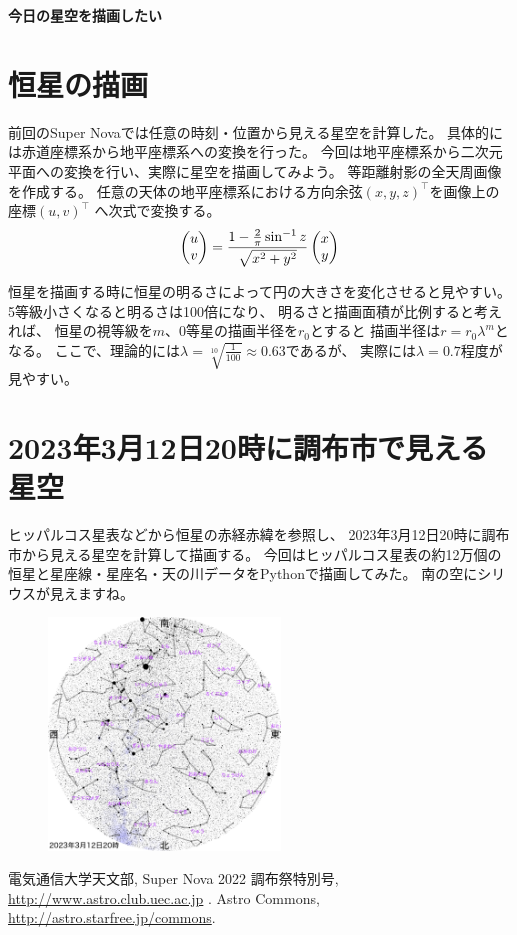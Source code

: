 \documentclass[
  paper=a4 , %
  book , %
  openany, %
  fontsize=10pt , %
  jafontsize=10pt, %
  gutter=25.6mm, %
  head_space=20mm, %
  foot_space=20mm, %
  line_length=165mm, %
  jlreq_warnings , %
]{jsarticle}
\def\mylove{\K=0 \loop\ifnum\K<100                                                  
女の子が好きだった...。\advance\K by1\repeat}
\begin{document}
\centerline{\Large{\bf 今日の星空を描画したい}}
\vspace{-3mm}
\section*{恒星の描画}
\vspace{-2mm}
前回のSuper Nova\cite{a}では任意の時刻・位置から見える星空を計算した。
具体的には赤道座標系から地平座標系への変換を行った。
今回は地平座標系から二次元平面への変換を行い、実際に星空を描画してみよう。
等距離射影の全天周画像を作成する。
任意の天体の地平座標系における方向余弦$(x,y,z)^\top$を画像上の座標$(u,v)^\top$
へ次式で変換する。
\vspace{-3mm}
\begin{align}
  \begin{pmatrix}
      u \\ v \\
  \end{pmatrix}
  =
  \frac{1-\frac{2}{\pi} \sin^{-1}{z}}{\sqrt{x^2 + y^2}}
  \begin{pmatrix}
    x \\ y \\
  \end{pmatrix}
  \notag
\end{align}

恒星を描画する時に恒星の明るさによって円の大きさを変化させると見やすい。
5等級小さくなると明るさは100倍になり、
明るさと描画面積が比例すると考えれば、
恒星の視等級を$m$、0等星の描画半径を$r_0$とすると
描画半径は$r = r_0 \lambda^m$となる。
ここで、理論的には$\lambda = \sqrt[10]{\frac{1}{100}} \approx 0.63$であるが、
実際には$\lambda = 0.7$程度が見やすい。

\vspace{-3mm}
\section*{2023年3月12日20時に調布市で見える星空}
\vspace{-2mm}
ヒッパルコス星表などから恒星の赤経赤緯を参照し、
2023年3月12日20時に調布市から見える星空を計算して描画する。
今回はヒッパルコス星表の約12万個の恒星と星座線・星座名・天の川データ\cite{b}をPythonで描画してみた。
南の空にシリウスが見えますね。%
\begin{figure}[h]
  \centering 
  \leavevmode
  \includegraphics[width=0.55\textwidth]{piari.png} 
\end{figure}

\vspace{-3mm}
\begin{thebibliography}{1}
   電気通信大学天文部, Super Nova 2022 調布祭特別号, \url{http://www.astro.club.uec.ac.jp} .
   Astro Commons, \url{http://astro.starfree.jp/commons}.
\end{thebibliography}
\end{document}

